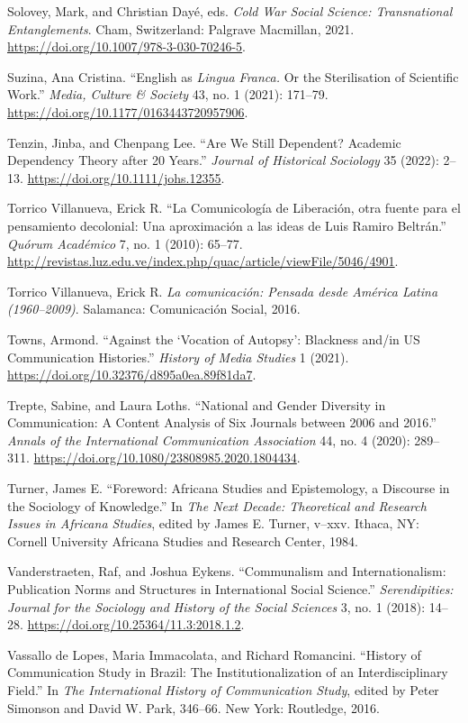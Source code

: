 \documentclass{tufte-handout}
\begin{document}
\begin{hangparas}{.25in}{1}
Solovey, Mark, and Christian Dayé, eds. \emph{Cold War Social Science:
Transnational Entanglements}. Cham, Switzerland: Palgrave Macmillan,
2021. \url{https://doi.org/10.1007/978-3-030-70246-5}.

Suzina, Ana Cristina. ``English as \emph{Lingua Franca.} Or the
Sterilisation of Scientific Work.'' \emph{Media, Culture \& Society} 43,
no. 1 (2021): 171--79. \url{https://doi.org/10.1177/0163443720957906}.

Tenzin, Jinba, and Chenpang Lee. ``Are We Still Dependent? Academic
Dependency Theory after 20 Years.'' \emph{Journal of Historical
Sociology} 35 (2022): 2--13. \url{https://doi.org/10.1111/johs.12355}.

Torrico Villanueva, Erick R. ``La Comunicología de Liberación, otra
fuente para el pensamiento decolonial: Una aproximación a las ideas de
Luis Ramiro Beltrán.'' \emph{Quórum Académico} 7, no. 1 (2010): 65--77.
\url{http://revistas.luz.edu.ve/index.php/quac/article/viewFile/5046/4901}.

Torrico Villanueva, Erick R. \emph{La comunicación: Pensada desde
América Latina (1960--2009)}. Salamanca: Comunicación Social, 2016.

Towns, Armond. ``Against the `Vocation of Autopsy': Blackness and/in US
Communication Histories.'' \emph{History of Media Studies} 1 (2021).
\url{https://doi.org/10.32376/d895a0ea.89f81da7}.

Trepte, Sabine, and Laura Loths. ``National and Gender Diversity in
Communication: A Content Analysis of Six Journals between 2006 and
2016.'' \emph{Annals of the International Communication Association} 44,
no. 4 (2020): 289--311.
\url{https://doi.org/10.1080/23808985.2020.1804434}.

Turner, James E. ``Foreword: Africana Studies and Epistemology, a
Discourse in the Sociology of Knowledge.'' In \emph{The Next Decade:
Theoretical and Research Issues in Africana Studies}, edited by James E.
Turner, v--xxv. Ithaca, NY: Cornell University Africana Studies and
Research Center, 1984.

Vanderstraeten, Raf, and Joshua Eykens. ``Communalism and
Internationalism: Publication Norms and Structures in International
Social Science.'' \emph{Serendipities: Journal for the Sociology and
History of the Social Sciences} 3, no. 1 (2018): 14--28.
\url{https://doi.org/10.25364/11.3:2018.1.2}.

Vassallo de Lopes, Maria Immacolata, and Richard Romancini. ``History of
Communication Study in Brazil: The Institutionalization of an
Interdisciplinary Field.'' In \emph{The International History of
Communication Study}, edited by Peter Simonson and David W. Park,
346--66. New York: Routledge, 2016.


\end{hangparas}
\end{document}

